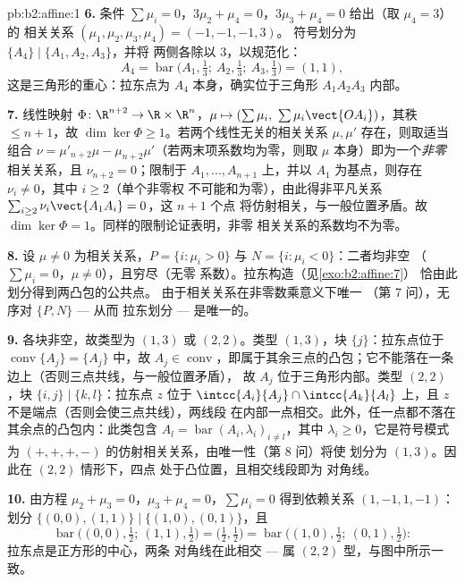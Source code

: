 \begin{solution}{pb:b2:affine:1}
\textbf{6.} 条件 $\sum\mu_i = 0$，$3\mu_2 + \mu_4 =
0$，$3\mu_3 + \mu_4 = 0$ 给出（取 $\mu_4 = 3$）的
相关关系 $(\mu_1, \mu_2, \mu_3, \mu_4) = (-1, -1, -1, 3)$。
符号划分为 $\{A_4\} \mid \{A_1, A_2, A_3\}$，并将
两侧各除以 $3$，以规范化：
\[
A_4 = \operatorname{bar}\bigl(A_1, \tfrac13;\ A_2, \tfrac13;\
A_3, \tfrac13\bigr) = (1,1),
\]
这是三角形的重心：拉东点为 $A_4$
本身，确实位于三角形 $A_1A_2A_3$ 内部。

\textbf{7.} 线性映射 $\Phi \colon \R^{n+2} \to \R
\times \R^n$，$\mu \mapsto (\sum\mu_i,\
\sum\mu_i\vect{OA_i})$，其秩 $\leq n + 1$，故 $\dim\ker
\Phi \geq 1$。若两个线性无关的相关关系 $\mu, \mu'$
存在，则取适当组合 $\nu = \mu'_{n+2}\mu -
\mu_{n+2}\mu'$（若两末项系数均为零，则取
$\mu$ 本身）即为一个\emph{非零}相关关系，且 $\nu_{n+2}
= 0$；限制于 $A_1, \dots, A_{n+1}$ 上，并以
$A_1$ 为基点，则存在 $\nu_i \neq 0$，其中 $i \geq 2$（单个非零权
不可能和为零），由此得非平凡关系
$\sum_{i\geq2}\nu_i\vect{A_1A_i} = 0$，这 $n+1$ 个点
将仿射相关，与一般位置矛盾。故 $\dim\ker
\Phi = 1$。同样的限制论证表明，非零
相关关系的系数均不为零。

\textbf{8.} 设 $\mu \neq 0$ 为相关关系，$P = \{i :
\mu_i > 0\}$ 与 $N = \{i : \mu_i < 0\}$：二者均非空
（$\sum\mu_i = 0$，$\mu \neq 0$），且穷尽（无零
系数）。拉东构造（见\cref{exo:b2:affine:7}）
恰由此划分得到两凸包的公共点。
由于相关关系在非零数乘意义下唯一
（第 7 问），无序对 $\{P, N\}$ --- 从而
拉东划分 --- 是唯一的。

\textbf{9.} 各块非空，故类型为 $(1,3)$ 或
$(2,2)$。类型 $(1,3)$，块 $\{j\}$：拉东点位于
$\operatorname{conv}\{A_j\} = \{A_j\}$ 中，故 $A_j \in
\operatorname{conv}$，即属于其余三点的凸包；它不能落在一条
边上（否则三点共线，与一般位置矛盾），
故 $A_j$ 位于三角形内部。类型
$(2,2)$，块 $\{i,j\} \mid \{k,l\}$：拉东点 $z$
位于 $\intcc{A_i}{A_j} \cap \intcc{A_k}{A_l}$ 上，且 $z$
不是端点（否则会使三点共线），两线段
在内部一点相交。此外，任一点都不落在
其余点的凸包内：此类包含 $A_l =
\operatorname{bar}(A_i, \lambda_i)_{i \neq l}$，其中
$\lambda_i \geq 0$，它是符号模式为
$(+,+,+,-)$ 的仿射相关关系，由唯一性（第 8 问）将使
划分为 $(1,3)$。因此在 $(2,2)$ 情形下，四点
处于凸位置，且相交线段即为
对角线。

\textbf{10.} 由方程 $\mu_2 + \mu_3 = 0$，$\mu_3 +
\mu_4 = 0$，$\sum\mu_i = 0$ 得到依赖关系 $(1, -1, 1,
-1)$：划分 $\{(0,0), (1,1)\} \mid \{(1,0), (0,1)\}$，且
\[
\operatorname{bar}\bigl((0,0), \tfrac12;\ (1,1),
\tfrac12\bigr) = \bigl(\tfrac12, \tfrac12\bigr) =
\operatorname{bar}\bigl((1,0), \tfrac12;\ (0,1),
\tfrac12\bigr) :
\]
拉东点是正方形的中心，两条
对角线在此相交 --- 属 $(2,2)$ 型，与图中所示一致。


\end{solution}
